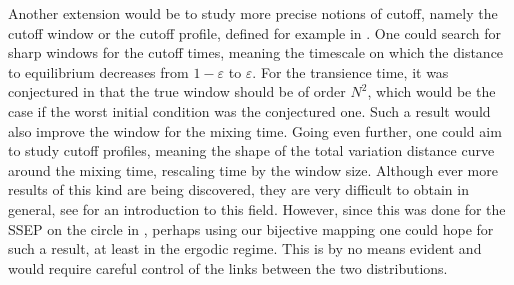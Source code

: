 \documentclass[11pt,a4paper]{article}
\begin{document}
Another extension would be to study more precise notions of cutoff, namely the cutoff window or the cutoff profile, defined for example in \cite[Section 2.2]{barrera_thermalisation_2020}. One could search for sharp windows for the cutoff times, meaning the timescale on which the distance to equilibrium decreases from $1-\varepsilon$ to $\varepsilon$. For the transience time, it was conjectured in \cite[Remark 1]{erignoux_cutoff_2024} that the true window should be of order $N^2$, which would be the case if the worst initial condition was the conjectured one. Such a result would also improve the window for the mixing time. Going even further, one could aim to study cutoff profiles, meaning the shape of the total variation distance curve around the mixing time, rescaling time by the window size. Although ever more results of this kind are being discovered, they are very difficult to obtain in general, see \cite{teyssier_every_2025} for an introduction to this field. However, since this was done for the SSEP on the circle in \cite{lacoin_cutoff_2016}, perhaps using our bijective mapping one could hope for such a result, at least in the ergodic regime. This is by no means evident and would require careful control of the links between the two distributions. 
\end{document}
